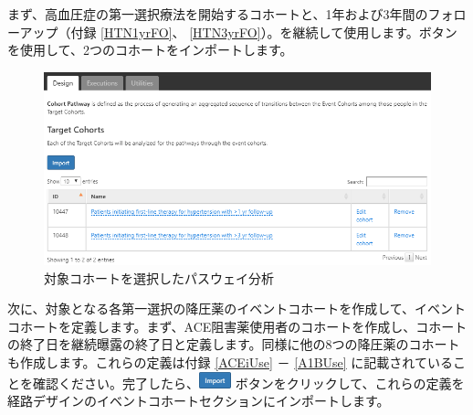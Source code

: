 \documentclass[
  11pt]{book}
\theoremstyle{definition}
\theoremstyle{definition}
\theoremstyle{definition}
\theoremstyle{definition}
\theoremstyle{remark}
\begin{document}
まず、高血圧症の第一選択療法を開始するコホートと、1年および3年間のフォローアップ（付録 \ref{HTN1yrFO}、 \ref{HTN3yrFO}）。を継続して使用します。ボタンを使用して、2つのコホートをインポートします。

\begin{figure}

{\centering \includegraphics[width=1\linewidth]{images/Characterization/atlasPathwaysTargetCohorts} 

}

\caption{対象コホートを選択したパスウェイ分析}\label{fig:atlasPathwaysTargetCohorts}
\end{figure}

次に、対象となる各第一選択の降圧薬のイベントコホートを作成して、イベントコホートを定義します。まず、ACE阻害薬使用者のコホートを作成し、コホートの終了日を継続曝露の終了日と定義します。同様に他の8つの降圧薬のコホートも作成します。これらの定義は付録 \ref{ACEiUse} － \ref{A1BUse} に記載されていることを確認ください。完了したら、\includegraphics{images/Characterization/atlasImportButton.png} ボタンをクリックして、これらの定義を経路デザインのイベントコホートセクションにインポートします。
\end{document}
